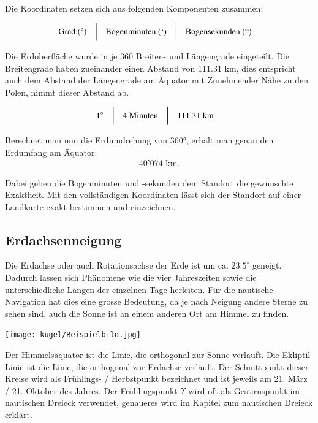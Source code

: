 \begin{refsection}
Die Koordinaten setzen sich aus folgenden Komponenten zusammen:

\[
\begin{aligned}
&\text{Grad } (^{\circ})
&
&\text{\bigg \vert}
&
&\text{Bogenminuten } (`)
&
&\text{\bigg \vert}
&
&\text{Bogensekunden } (``)
\end{aligned}
\]

Die Erdoberfläche wurde in je 360 Breiten- und Längengrade eingeteilt. Die Breitengrade haben zueinander einen Abstand von 111.31 km, dies entspricht auch dem Abstand der Längengrade am Äquator mit Zunehmender Nähe zu den Polen, nimmt dieser Abstand ab.

\[
\begin{aligned}
&1^{\circ}
&
&\text{\bigg \vert}
&
&4 \text{ Minuten}
&
&\text{\bigg \vert}
&
&111.31\text{ km}
\end{aligned}
\]

Berechnet man nun die Erdumdrehung von 360°, erhält man genau den Erdumfang am Äquator: \begin{align*} 40’074 \text{ km.}\end{align*}

Dabei geben die Bogenminuten und -sekunden dem Standort die gewünschte Exaktheit. Mit den vollständigen Koordinaten lässt sich der Standort auf einer Landkarte exakt bestimmen und einzeichnen.

\subsection{Erdachsenneigung}

Die Erdachse oder auch Rotationsachse der Erde ist um ca. $23.5^{\circ}$ geneigt.
Dadurch lassen sich Phänomene wie die vier Jahreszeiten sowie die unterschiedliche Längen der einzelnen Tage herleiten.
Für die nautische Navigation hat dies eine grosse Bedeutung, da je nach Neigung andere Sterne zu sehen sind, auch die Sonne ist an einem anderen Ort am Himmel zu finden.

\begin{center}
        \texttt{[image: kugel/Beispielbild.jpg]}
\end{center}

Der Himmelsäquator ist die Linie, die orthogonal zur Sonne verläuft.
Die Ekliptil-Linie ist die Linie, die orthogonal zur Erdachse verläuft.
Der Schnittpunkt dieser Kreise wird als Frühlings- / Herbstpunkt bezeichnet und ist jeweils am 21. März / 21. Oktober des Jahres.
Der Frühlingspunkt $\Upsilon$ wird oft als Gestirnspunkt im nautischen Dreieck verwendet, genaueres wird im Kapitel zum nautischen Dreieck erklärt.



\end{refsection}

